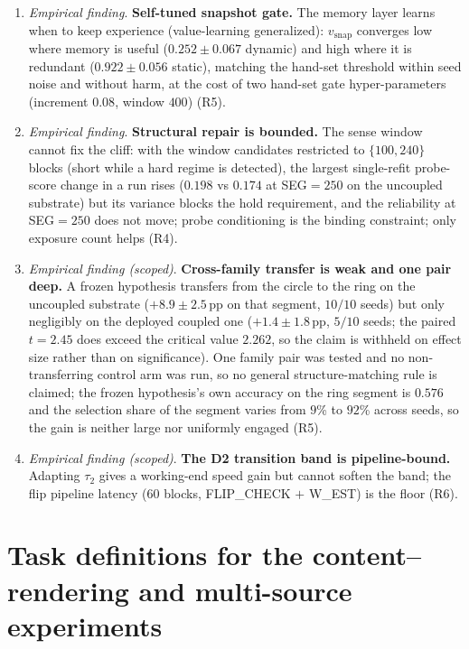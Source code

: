 \documentclass[preprint,12pt]{elsarticle}
\begin{document}
\begin{enumerate}[label=\arabic*.]
probe change ($0.129\pm0.051$, SEG$=500$) and the diluted genuine signal
($0.188\pm0.030$) are separable on average but not pointwise: the seed
distributions overlap, so the trigger margin trades the two error types
rather than separating them; $0.10$ is the most permissive setting of the
scan and the cliff is structural (R4).
\item \emph{Empirical finding}. \textbf{Self-tuned snapshot gate.} The memory layer learns when to
keep experience (value-learning generalized): $v_{\mathrm{snap}}$ converges
low where memory is useful ($0.252\pm0.067$ dynamic) and high where it is
redundant ($0.922\pm0.056$ static), matching the hand-set threshold within
seed noise and without harm, at the cost of two hand-set gate
hyper-parameters (increment $0.08$, window $400$) (R5).
\item \emph{Empirical finding}. \textbf{Structural repair is bounded.} The sense window cannot fix the
cliff: with the window candidates restricted to $\{100,240\}$ blocks
(short while a hard regime is detected), the largest single-refit probe-score
change in a run rises ($0.198$ vs $0.174$ at SEG$=250$ on the uncoupled
substrate) but its variance blocks the hold requirement, and the reliability
at SEG$=250$ does not move; probe conditioning is the binding constraint; only
exposure count helps (R4).
\item \emph{Empirical finding (scoped)}. \textbf{Cross-family transfer is weak and one pair deep.}
A frozen hypothesis transfers from the circle to the ring on the uncoupled
substrate ($+8.9\pm2.5$\,pp on that segment, $10/10$ seeds) but only
negligibly on the deployed coupled one ($+1.4\pm1.8$\,pp, $5/10$ seeds; the
paired $t=2.45$ does exceed the critical value $2.262$, so the claim is
withheld on effect size rather than on significance). One
family pair was tested and no non-transferring control arm was run, so no
general structure-matching rule is claimed; the frozen hypothesis's own
accuracy on the ring segment is $0.576$ and the selection share of the segment
varies from $9$\% to $92$\% across seeds, so the gain is neither large nor
uniformly engaged (R5).
\item \emph{Empirical finding (scoped)}. \textbf{The D2 transition band is pipeline-bound.} Adapting $\tau_2$
gives a working-end speed gain but cannot soften the band; the flip pipeline
latency ($60$ blocks, FLIP\_CHECK $+$ W\_EST) is the floor (R6).
\end{enumerate}

\section{Task definitions for the content--rendering and multi-source
experiments}
\label{app:s63s64}
\end{document}
